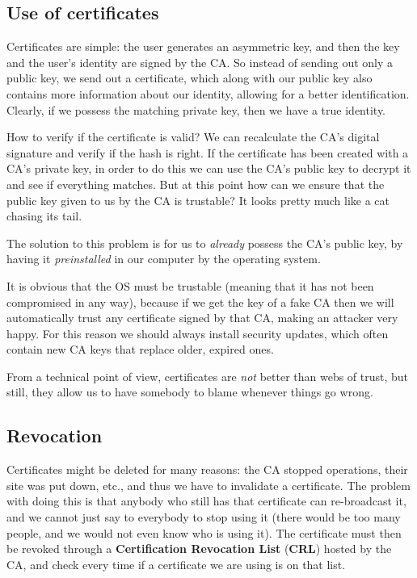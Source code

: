 \subsection{Use of certificates}
Certificates are simple: the user generates an asymmetric key, and then the key and the user’s identity are signed by the CA. So instead of sending out only a public key, we send out a certificate, which along with our public key also contains more information about our identity, allowing for a better identification. Clearly, if we possess the matching private key, then we have a true identity.

How to verify if the certificate is valid? We can recalculate the CA's digital signature and verify if the hash is right. If the certificate has been created with a CA's private key, in order to do this we can use the CA's public key to decrypt it and see if everything matches. But at this point how can we ensure that the public key given to us by the CA is trustable? It looks pretty much like a cat chasing its tail.

The solution to this problem is for us to \textit{already} possess the CA's public key, by having it \textit{preinstalled} in our computer by the operating system.


It is obvious that the OS must be trustable (meaning that it has not been compromised in any way), because if we get the key of a fake CA then we will automatically trust any certificate signed by that CA, making an attacker very happy. For this reason we should always install security updates, which often contain new CA keys that replace older, expired ones.

From a technical point of view, certificates are \textit{not} better than webs of trust, but still, they allow us to have somebody to blame whenever things go wrong.


\subsection{Revocation}
Certificates might be deleted for many reasons: the CA stopped operations, their site was put down, etc., and thus we have to invalidate a certificate. The problem with doing this is that anybody who still has that certificate can re-broadcast it, and we cannot just say to everybody to stop using it (there would be too many people, and we would not even know who is using it). The certificate must then be revoked through a \textbf{Certification Revocation List} (\textbf{CRL}) hosted by the CA, and check every time if a certificate we are using is on that list.


